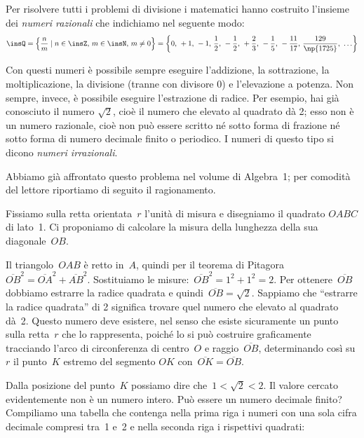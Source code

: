 Per risolvere tutti i problemi di divisione i matematici hanno costruito l'insieme dei \emph{numeri razionali} che indichiamo nel seguente modo:
\[
\insQ=\left\{\frac{n}{m} \mid n\in \insZ\text{, }m\in \insN\text{, }m\neq
0\right\}=\left\{0\text{, }+1\text{, }-1\text{, }\frac{1}{2}\text{, }-\frac{1}{2}\text{, }+\frac{2}{3}\text{, }-\frac{1}{5}\text{, }-\frac{11}{17}\text{, }\frac{129}{\np{1725}}\text{, }\ldots\right\}
\]

Con questi numeri è possibile sempre eseguire l'addizione, la sottrazione, la moltiplicazione, la divisione (tranne con divisore 0) e l'elevazione a potenza. Non sempre, invece, è possibile eseguire l'estrazione di radice. Per esempio, hai già conosciuto il numero $\sqrt{2}$, cioè il numero che elevato al quadrato dà 2; esso non è un numero razionale, cioè non può essere scritto né sotto forma di frazione né sotto forma di numero decimale finito o periodico. I numeri di questo tipo si dicono \emph{numeri irrazionali}.

Abbiamo già affrontato questo problema nel volume di Algebra~1; per comodità del lettore riportiamo di seguito il ragionamento.

Fissiamo sulla retta orientata~$r$ l'unità di misura e disegniamo il quadrato $OABC$ di lato~1. Ci proponiamo di calcolare
la misura della lunghezza della sua diagonale~$OB$.

\begin{center}
 
\end{center}

Il triangolo~$OAB$ è retto in~$A$, quindi per il teorema di
Pitagora~$\overline{OB}^{2}=\overline{OA}^{2}+\overline{AB}^{2}$.
Sostituiamo le misure:~$\overline{OB}^{2}=1^2+1^2=2$. Per ottenere~$\overline{OB}$
dobbiamo estrarre la radice quadrata e quindi~$\overline{OB}=\sqrt{2}$.
Sappiamo che ``estrarre la radice quadrata'' di 2 significa trovare quel numero
che elevato al quadrato dà~2. Questo numero deve esistere, nel senso
che esiste sicuramente un punto sulla retta~$r$ che lo rappresenta, poiché lo si può costruire graficamente tracciando l'arco di
circonferenza di centro~$O$ e raggio~$\overline{OB}$, determinando così su $r$ il punto~$K$ estremo del segmento $OK$ con~$\overline{OK} = \overline{OB}$.

Dalla posizione del punto~$K$ possiamo dire che~$1<\sqrt{2}<2$. Il
valore cercato evidentemente non è un numero intero. Può essere un
numero decimale finito? Compiliamo una tabella che contenga nella prima
riga i numeri con una sola cifra decimale compresi tra~1 e~2 e nella
seconda riga i rispettivi quadrati:

